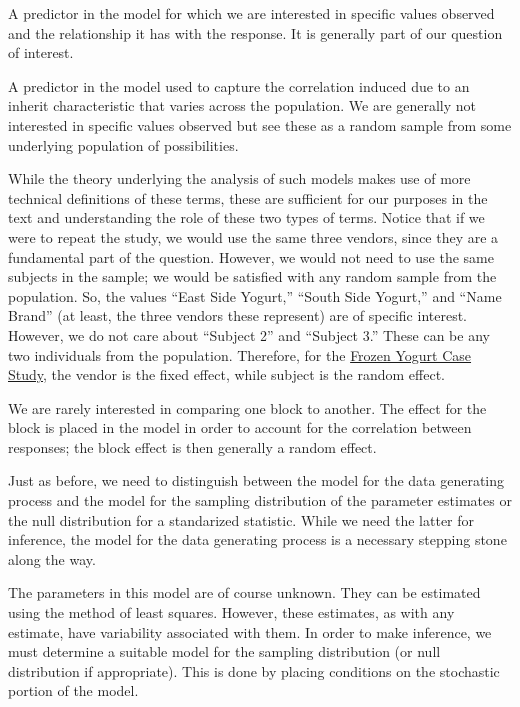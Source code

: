 \documentclass[]{book}
\theoremstyle{plain}
\theoremstyle{mydefn}
\theoremstyle{myexmpl}
\theoremstyle{remark}
\let\BeginKnitrBlock\begin \let\EndKnitrBlock\end
\let\BeginKnitrBlock\begin \let\EndKnitrBlock\end
\begin{document}
\BeginKnitrBlock{definition}[Fixed Effect]
\protect\hypertarget{def:defn-fixed-effect}{}{\label{def:defn-fixed-effect}
{} }A predictor in the model for which we are
interested in specific values observed and the relationship it has with
the response. It is generally part of our question of interest.
\EndKnitrBlock{definition}

\BeginKnitrBlock{definition}[Random Effect]
\protect\hypertarget{def:defn-random-effect}{}{\label{def:defn-random-effect}
{} }A predictor in the model used to capture
the correlation induced due to an inherit characteristic that varies
across the population. We are generally not interested in specific
values observed but see these as a random sample from some underlying
population of possibilities.
\EndKnitrBlock{definition}

While the theory underlying the analysis of such models makes use of
more technical definitions of these terms, these are sufficient for our
purposes in the text and understanding the role of these two types of
terms. Notice that if we were to repeat the study, we would use the same
three vendors, since they are a fundamental part of the question.
However, we would not need to use the same subjects in the sample; we
would be satisfied with any random sample from the population. So, the
values ``East Side Yogurt,'' ``South Side Yogurt,'' and ``Name Brand''
(at least, the three vendors these represent) are of specific interest.
However, we do not care about ``Subject 2'' and ``Subject 3.'' These can
be any two individuals from the population. Therefore, for the
\protect\hyperlink{CaseYogurt}{Frozen Yogurt Case Study}, the vendor is
the fixed effect, while subject is the random effect.

\BeginKnitrBlock{rmdtip}
We are rarely interested in comparing one block to another. The effect
for the block is placed in the model in order to account for the
correlation between responses; the block effect is then generally a
random effect.
\EndKnitrBlock{rmdtip}

Just as before, we need to distinguish between the model for the data
generating process and the model for the sampling distribution of the
parameter estimates or the null distribution for a standarized
statistic. While we need the latter for inference, the model for the
data generating process is a necessary stepping stone along the way.

The parameters in this model are of course unknown. They can be
estimated using the method of least squares. However, these estimates,
as with any estimate, have variability associated with them. In order to
make inference, we must determine a suitable model for the sampling
distribution (or null distribution if appropriate). This is done by
placing conditions on the stochastic portion of the model.
\end{document}
